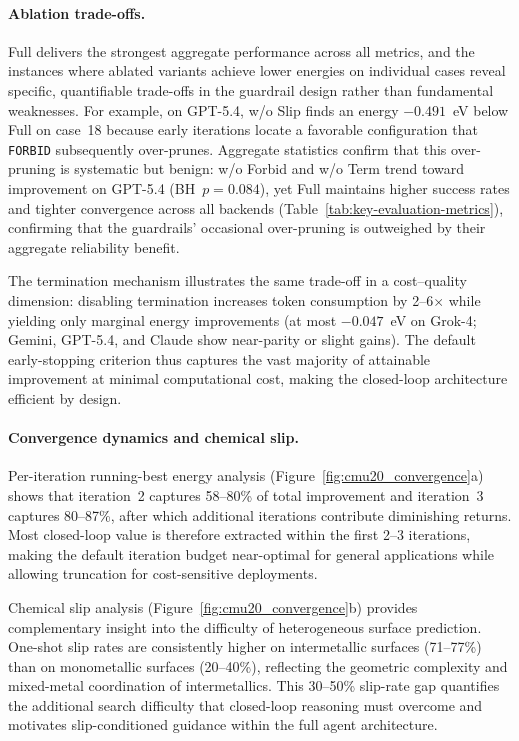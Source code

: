 \paragraph{Ablation trade-offs.}
Full delivers the strongest aggregate performance across all metrics, and the instances where ablated variants achieve lower energies on individual cases reveal specific, quantifiable trade-offs in the guardrail design rather than fundamental weaknesses.
For example, on GPT-5.4, w/o Slip finds an energy $-0.491$~eV below Full on case~18 because early iterations locate a favorable configuration that \texttt{FORBID} subsequently over-prunes.
Aggregate statistics confirm that this over-pruning is systematic but benign: w/o Forbid and w/o Term trend toward improvement on GPT-5.4 (BH~$p = 0.084$), yet Full maintains higher success rates and tighter convergence across all backends (Table~\ref{tab:key-evaluation-metrics}), confirming that the guardrails' occasional over-pruning is outweighed by their aggregate reliability benefit.

The termination mechanism illustrates the same trade-off in a cost--quality dimension: disabling termination increases token consumption by 2--6$\times$ while yielding only marginal energy improvements (at most $-0.047$~eV on Grok-4; Gemini, GPT-5.4, and Claude show near-parity or slight gains).
The default early-stopping criterion thus captures the vast majority of attainable improvement at minimal computational cost, making the closed-loop architecture efficient by design.

\paragraph{Convergence dynamics and chemical slip.}
Per-iteration running-best energy analysis (Figure~\ref{fig:cmu20_convergence}a) shows that iteration~2 captures 58--80\% of total improvement and iteration~3 captures 80--87\%, after which additional iterations contribute diminishing returns.
Most closed-loop value is therefore extracted within the first 2--3 iterations, making the default iteration budget near-optimal for general applications while allowing truncation for cost-sensitive deployments.

Chemical slip analysis (Figure~\ref{fig:cmu20_convergence}b) provides complementary insight into the difficulty of heterogeneous surface prediction.
One-shot slip rates are consistently higher on intermetallic surfaces (71--77\%) than on monometallic surfaces (20--40\%), reflecting the geometric complexity and mixed-metal coordination of intermetallics.
This 30--50\% slip-rate gap quantifies the additional search difficulty that closed-loop reasoning must overcome and motivates slip-conditioned guidance within the full agent architecture.


